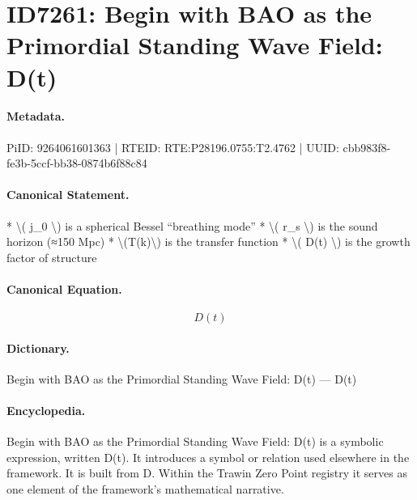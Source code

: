 \section*{ID7261: Begin with BAO as the Primordial Standing Wave Field: D(t)}
\paragraph{Metadata.}
PiID: 9264061601363 | RTEID: RTE:P28196.0755:T2.4762 | UUID: cbb983f8-fe3b-5ccf-bb38-0874b6f88c84

\paragraph{Canonical Statement.}
* \textbackslash{}( j\_0 \textbackslash{}) is a spherical Bessel “breathing mode” * \textbackslash{}( r\_s \textbackslash{}) is the sound horizon (≈150 Mpc) * \textbackslash{}(T(k)\textbackslash{}) is the transfer function * \textbackslash{}( D(t) \textbackslash{}) is the growth factor of structure

\paragraph{Canonical Equation.}
\[
D(t)
\]

\paragraph{Dictionary.}
Begin with BAO as the Primordial Standing Wave Field: D(t) — D(t)

\paragraph{Encyclopedia.}
Begin with BAO as the Primordial Standing Wave Field: D(t) is a symbolic expression, written D(t). It introduces a symbol or relation used elsewhere in the framework. It is built from D. Within the Trawin Zero Point registry it serves as one element of the framework's mathematical narrative.
